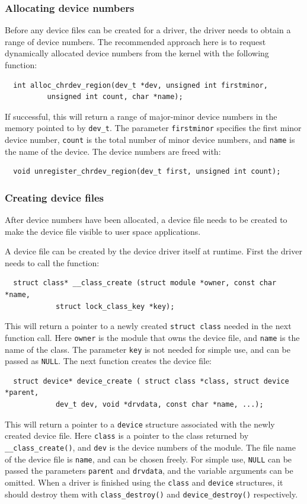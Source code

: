 \subsubsection{Allocating device numbers}
Before any device files can be created for a driver, the driver needs to obtain a range of device numbers. The recommended approach here is to request dynamically allocated device numbers from the kernel with the following function:
\begin{verbatim}
  int alloc_chrdev_region(dev_t *dev, unsigned int firstminor,
          unsigned int count, char *name);
\end{verbatim}
If successful, this will return a range of major-minor device numbers in the memory pointed to by \texttt{dev\_t}. The parameter \texttt{firstminor} specifies the first minor device number, \texttt{count} is the total number of minor device numbers, and \texttt{name} is the name of the device. The device numbers are freed with:
\begin{verbatim}
  void unregister_chrdev_region(dev_t first, unsigned int count);
\end{verbatim}

\subsubsection{Creating device files}\label{sec:creating-device-files}
After device numbers have been allocated, a device file needs to be created to make the device file visible to user space applications.

A device file can be created by the device driver itself at runtime. First the driver needs to call the function:
\begin{verbatim}
  struct class* __class_create (struct module *owner, const char *name,
            struct lock_class_key *key);
\end{verbatim}
This will return a pointer to a newly created \texttt{struct class} needed in the next function call. Here \texttt{owner} is the module that owns the device file, and \texttt{name} is the name of the class. The parameter \texttt{key} is not needed for simple use, and can be passed as \texttt{NULL}. The next function creates the device file:
\begin{verbatim}
  struct device* device_create ( struct class *class, struct device *parent,
            dev_t dev, void *drvdata, const char *name, ...);
\end{verbatim}
This will return a pointer to a \texttt{device} structure associated with the newly created device file. Here \texttt{class} is a pointer to the class returned by \texttt{\_\_class\_create()}, and \texttt{dev} is the device numbers of the module. The file name of the device file is \texttt{name}, and can be chosen freely. For simple use, \texttt{NULL} can be passed the parameters \texttt{parent} and \texttt{drvdata}, and the variable arguments can be omitted. When a driver is finished using the \texttt{class} and \texttt{device} structures, it should destroy them with \texttt{class\_destroy()} and \texttt{device\_destroy()} respectively.

